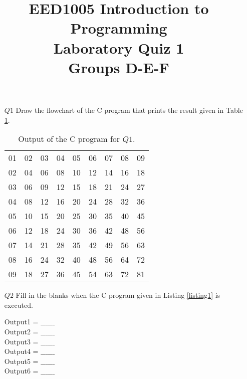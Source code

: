\documentclass[10pt,a4paper]{article}
\title{\centering 
	EED1005 Introduction to Programming\\
	Laboratory Quiz 1 \\
	\small \hfill Groups D-E-F}
\begin{document}
	\maketitle	
	\begin{enumerate}
		\item[$Q1$] Draw the flowchart of the C program that prints the result given in Table \ref{tab: table1}.
		
		\begin{table}[!htbp]
		\centering
		\begin{tabular}{c c c c c c c c c}
		01 & 02 & 03 & 04 & 05 & 06 & 07 & 08 & 09 \\
		02 & 04 & 06 & 08 & 10 & 12 & 14 & 16 & 18 \\
		03 & 06 & 09 & 12 & 15 & 18 & 21 & 24 & 27\\
		04 & 08 & 12 & 16 & 20 & 24 & 28 & 32 & 36 \\
		05 & 10 & 15 & 20 & 25 & 30 & 35 & 40 & 45 \\
		06 & 12 & 18 & 24 & 30 & 36 & 42 & 48 & 56 \\
		07 & 14 & 21 & 28 & 35 & 42 & 49 & 56 & 63 \\
		08 & 16 & 24 & 32 & 40 & 48 & 56 & 64 & 72 \\
		09 & 18 & 27 & 36 & 45 & 54 & 63 & 72 & 81 \\
		\end{tabular}
		
		\caption{Output of the C program for $Q1$.}
		\label{tab: table1}
		\end{table}
		
		\newpage
		\item[$Q2$] Fill in the blanks when the C program given in Listing \ref{listing1}  is executed.
		
		
		
		Output1 = $\_\_\_\_\_\_$\\
		
		Output2 = $\_\_\_\_\_\_$\\
		
		Output3 = $\_\_\_\_\_\_$\\
		
		Output4 = $\_\_\_\_\_\_$\\
		
		Output5 = $\_\_\_\_\_\_$\\
		
		Output6 = $\_\_\_\_\_\_$\\
	\end{enumerate}
\end{document}
